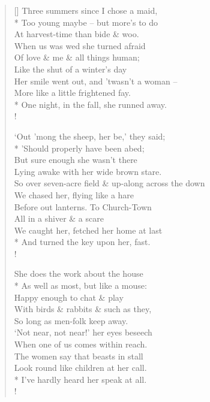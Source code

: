 \documentclass[MAIN]{subfiles}
\begin{document}
\settowidth{\versewidth}{So over seven-acre field \& up-along across the down}
\begin{verse}[\versewidth]
\vin Three summers since I chose a maid,\\*
\vin Too young maybe -- but more's to do\\
\vin At harvest-time than bide \& woo.\\
\vin \vin When us was wed she turned afraid\\
\vin Of love \& me \& all things human;\\
\vin Like the shut of a winter's day\\
\vin Her smile went out, and 'twasn't a woman --\\
\vin More like a little frightened fay.\\*
\vin \vin One night, in the fall, she runned away.\\!

\vin `Out 'mong the sheep, her be,' they said;\\*
\vin 'Should properly have been abed;\\
\vin But sure enough she wasn't there\\
\vin Lying awake with her wide brown stare.\\
So over seven-acre field \& up-along across the down\\
\vin We chased her, flying like a hare\\
\vin Before out lanterns. To {\sc Church-Town}\\
\vin \vin All in a shiver \& a scare\\
\vin We caught her, fetched her home at last\\*
\vin \vin And turned the key upon her, fast.\\!

\vin She does the work about the house\\*
\vin As well as most, but like a mouse:\\
\vin Happy enough to chat \& play\\
\vin \vin With birds \& rabbits \& such as they,\\
\vin \vin So long as men-folk keep away.\\
\vin `Not near, not near!' her eyes beseech\\
\vin When one of us comes within reach.\\
\vin \vin The women say that beasts in stall\\
\vin \vin Look round like children at her call.\\*
\vin \vin I've hardly heard her speak at all.\\!


\end{verse}
\end{document}
